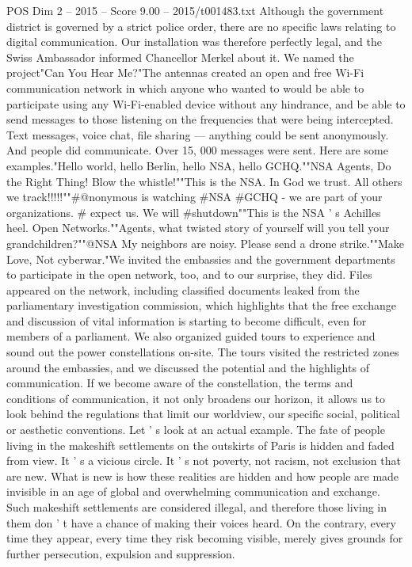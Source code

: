 \begin{textsample}{POS Dim 2 – 2015 – Score 9.00 – 2015/t001483.txt}
Although the government district is governed by a strict police order, there are no specific laws relating to digital communication.
Our installation was therefore perfectly legal, and the Swiss Ambassador informed Chancellor Merkel about it.
We named the project"Can You Hear Me?"The antennas created an open and free Wi-Fi communication network in which anyone who wanted to would be able to participate using any Wi-Fi-enabled device without any hindrance, and be able to send messages to those listening on the frequencies that were being intercepted.
Text messages, voice chat, file sharing — anything could be sent anonymously.
And people did communicate.
Over 15, 000 messages were sent.
Here are some examples."Hello world, hello Berlin, hello NSA, hello GCHQ.""NSA Agents, Do the Right Thing!
Blow the whistle!""This is the NSA.
In God we trust.
All others we track!!!!!""\#@nonymous is watching \#NSA \#GCHQ - we are part of your organizations. \# expect us.
We will \#shutdown""This is the NSA ' s Achilles heel.
Open Networks.""Agents, what twisted story of yourself will you tell your grandchildren?""@NSA My neighbors are noisy.
Please send a drone strike.""Make Love, Not cyberwar."We invited the embassies and the government departments to participate in the open network, too, and to our surprise, they did.
Files appeared on the network, including classified documents leaked from the parliamentary investigation commission, which highlights that the free exchange and discussion of vital information is starting to become difficult, even for members of a parliament.
We also organized guided tours to experience and sound out the power constellations on-site.
The tours visited the restricted zones around the embassies, and we discussed the potential and the highlights of communication.
If we become aware of the constellation, the terms and conditions of communication, it not only broadens our horizon, it allows us to look behind the regulations that limit our worldview, our specific social, political or aesthetic conventions.
Let ' s look at an actual example.
The fate of people living in the makeshift settlements on the outskirts of Paris is hidden and faded from view.
It ' s a vicious circle.
It ' s not poverty, not racism, not exclusion that are new.
What is new is how these realities are hidden and how people are made invisible in an age of global and overwhelming communication and exchange.
Such makeshift settlements are considered illegal, and therefore those living in them don ' t have a chance of making their voices heard.
On the contrary, every time they appear, every time they risk becoming visible, merely gives grounds for further persecution, expulsion and suppression.

\end{textsample}
